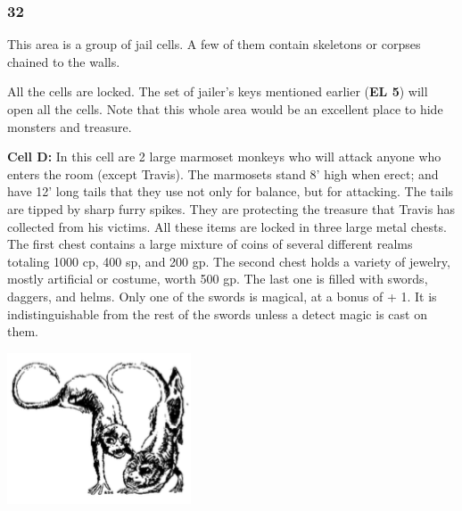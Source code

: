 \documentclass[palace_of_the_silver_princess]{subfiles}
\begin{document}
\subsubsection{32}
\begin{quotebox}
    This area is a group of jail cells. A few of them contain skeletons
    or corpses chained to the walls.
\end{quotebox}

All the cells are locked. The set of jailer’s keys mentioned earlier
(\textbf{EL 5}) will open all the cells. Note that this whole area would be an
excellent place to hide monsters and treasure.

\textbf{Cell D:} In this cell are 2 large marmoset monkeys who will
attack anyone who enters the room (except Travis). The marmosets stand
8’ high when erect; and have 12’ long tails that they use not only for
balance, but for attacking. The tails are tipped by sharp furry
spikes. They are protecting the treasure that Travis has collected
from his victims. All these items are locked in three large metal
chests. The first chest contains a large mixture of coins of several
different realms totaling 1000 cp, 400 sp, and 200 gp. The second chest
holds a variety of jewelry, mostly artificial or costume, worth 500 gp.
The last one is filled with swords, daggers, and helms. Only one of the
swords is magical, at a bonus of + 1. It is indistinguishable from the
rest of the swords unless a detect magic is cast on them.

\includegraphics[width=\columnwidth]{img/marmoset.png}
\end{document}
